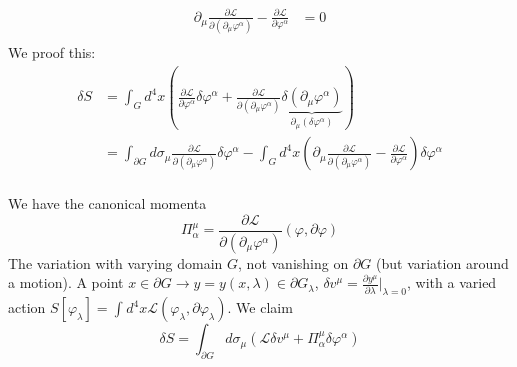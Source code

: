 \documentclass{report}
\begin{document}
\begin{align*}
  \partial_\mu \frac{\partial \mathcal{L} }{\partial ( \partial_\mu \varphi^{\alpha}   )} - \frac{\partial \mathcal{L} }{\partial \varphi^{\alpha} }  &=  0 \\
\end{align*}
We proof this:
\begin{align*}
  \delta S &= \int_{G}^{} d^{4} x \left( \frac{\partial \mathcal{L} }{\partial \varphi^{\alpha} } \delta \varphi^{\alpha} + \frac{\partial \mathcal{L} }{\partial ( \partial_\mu \varphi^{\alpha}   )} \underbrace{\delta( \partial_\mu \varphi^{\alpha}   )}_{\partial_\mu \left( \delta \varphi^{\alpha}  \right)  }  \right) \\ 
  &= \int_{\partial G }^{} d\sigma_\mu \frac{\partial \mathcal{L} }{\partial \left( \partial_\mu \varphi^{\alpha}   \right) } \delta \varphi^{\alpha} - \int_{G}^{} d^{4} x \left( \partial_\mu \frac{\partial \mathcal{L} }{\partial \left( \partial_\mu \varphi^{\alpha}   \right)  }  - \frac{\partial \mathcal{L} }{\partial \varphi^{\alpha} }   \right) \delta \varphi^{\alpha}    \\
\end{align*}

We have the canonical momenta \[
\Pi^{\mu}_\alpha = \frac{\partial \mathcal{L} }{\partial \left( \partial_\mu \varphi^{\alpha}   \right) } \left( \varphi, \partial \varphi  \right) 
\] 
The variation with varying domain $G$, not vanishing on $\partial G $ (but variation around a motion). A point  $x \in \partial G \to y = y( x, \lambda ) \in \partial G_\lambda  $, $\delta v^{\mu} = \frac{\partial y^{\mu} }{\partial \lambda} |_{\lambda=0} $, with a varied action $S\left[ \varphi_\lambda \right] = \int_{}^{} d^{4} x \mathcal{L} \left( \varphi_\lambda, \partial \varphi_\lambda  \right)  $. We claim \[
\delta S = \int_{\partial G}^{} d \sigma_\mu \left( \mathcal{L}  \delta v^{\mu} + \Pi^{\mu}_{\alpha} \delta \varphi^{\alpha}  \right)  
\] 
\end{document}
